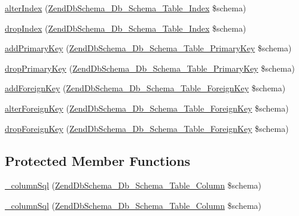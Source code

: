 \begin{DoxyCompactItemize}
\item 
\hyperlink{classZendDbSchema__Db__Schema__Generator__Mysql_a0f94d6cabe125b387efa64fc7160a9e5}{alter\-Index} (\hyperlink{classZendDbSchema__Db__Schema__Table__Index}{\-Zend\-Db\-Schema\-\_\-\-Db\-\_\-\-Schema\-\_\-\-Table\-\_\-\-Index} \$schema)
\item 
\hyperlink{classZendDbSchema__Db__Schema__Generator__Mysql_a196fb89cf511d31c7124169247de1a6d}{drop\-Index} (\hyperlink{classZendDbSchema__Db__Schema__Table__Index}{\-Zend\-Db\-Schema\-\_\-\-Db\-\_\-\-Schema\-\_\-\-Table\-\_\-\-Index} \$schema)
\item 
\hyperlink{classZendDbSchema__Db__Schema__Generator__Mysql_ad1d5ebbad469fcd572d46f08f9f0e5ab}{add\-Primary\-Key} (\hyperlink{classZendDbSchema__Db__Schema__Table__PrimaryKey}{\-Zend\-Db\-Schema\-\_\-\-Db\-\_\-\-Schema\-\_\-\-Table\-\_\-\-Primary\-Key} \$schema)
\item 
\hyperlink{classZendDbSchema__Db__Schema__Generator__Mysql_acc787f589296a3638f713b91456acafb}{drop\-Primary\-Key} (\hyperlink{classZendDbSchema__Db__Schema__Table__PrimaryKey}{\-Zend\-Db\-Schema\-\_\-\-Db\-\_\-\-Schema\-\_\-\-Table\-\_\-\-Primary\-Key} \$schema)
\item 
\hyperlink{classZendDbSchema__Db__Schema__Generator__Mysql_a4b0c6d7fbd4d21f027facb6e495d1f6b}{add\-Foreign\-Key} (\hyperlink{classZendDbSchema__Db__Schema__Table__ForeignKey}{\-Zend\-Db\-Schema\-\_\-\-Db\-\_\-\-Schema\-\_\-\-Table\-\_\-\-Foreign\-Key} \$schema)
\item 
\hyperlink{classZendDbSchema__Db__Schema__Generator__Mysql_a16b347a1c95888775b09d14505bae2b2}{alter\-Foreign\-Key} (\hyperlink{classZendDbSchema__Db__Schema__Table__ForeignKey}{\-Zend\-Db\-Schema\-\_\-\-Db\-\_\-\-Schema\-\_\-\-Table\-\_\-\-Foreign\-Key} \$schema)
\item 
\hyperlink{classZendDbSchema__Db__Schema__Generator__Mysql_afa7990c889464576d30d4a110e9b0fac}{drop\-Foreign\-Key} (\hyperlink{classZendDbSchema__Db__Schema__Table__ForeignKey}{\-Zend\-Db\-Schema\-\_\-\-Db\-\_\-\-Schema\-\_\-\-Table\-\_\-\-Foreign\-Key} \$schema)
\end{DoxyCompactItemize}
\subsection*{\-Protected \-Member \-Functions}
\begin{DoxyCompactItemize}
\item 
\hyperlink{classZendDbSchema__Db__Schema__Generator__Mysql_ab808aafb85b6359cacdb4cc3fe757d6b}{\-\_\-column\-Sql} (\hyperlink{classZendDbSchema__Db__Schema__Table__Column}{\-Zend\-Db\-Schema\-\_\-\-Db\-\_\-\-Schema\-\_\-\-Table\-\_\-\-Column} \$schema)
\item 
\hyperlink{classZendDbSchema__Db__Schema__Generator__Mysql_ab808aafb85b6359cacdb4cc3fe757d6b}{\-\_\-column\-Sql} (\hyperlink{classZendDbSchema__Db__Schema__Table__Column}{\-Zend\-Db\-Schema\-\_\-\-Db\-\_\-\-Schema\-\_\-\-Table\-\_\-\-Column} \$schema)
\end{DoxyCompactItemize}


